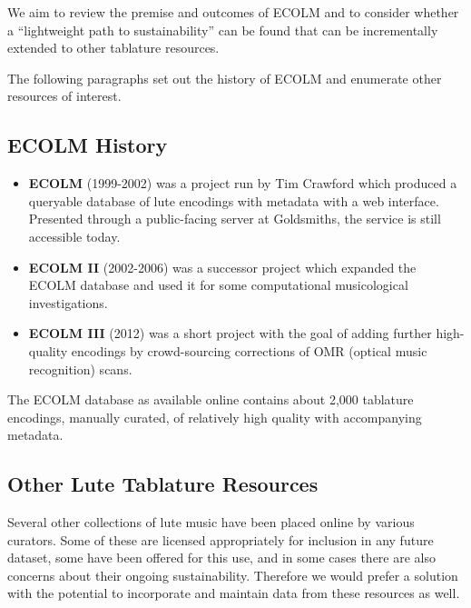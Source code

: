 \documentclass[sigconf]{acmart}
\begin{document}
\begin{sloppypar}
  We aim to review the premise and outcomes of ECOLM and to consider
  whether a ``lightweight path to sustainability'' can be found that
  can be incrementally extended to other tablature resources.

  The following paragraphs set out the history of ECOLM and enumerate
  other resources of interest.

  \subsection{ECOLM History}

  \begin{itemize}
  \item {\bf ECOLM} (1999-2002) was a project run by Tim Crawford
    which produced a queryable database of lute encodings with
    metadata with a web interface. Presented through a public-facing
    server at Goldsmiths, the service is still accessible today.
  \item {\bf ECOLM II} (2002-2006) was a successor project which
    expanded the ECOLM database and used it for some computational
    musicological investigations.
  \item {\bf ECOLM III} (2012) was a short project with the goal of
    adding further high-quality encodings by crowd-sourcing
    corrections of OMR (optical music recognition) scans.
  \end{itemize}

  The ECOLM database as available online contains about 2,000
  tablature encodings, manually curated, of relatively high quality
  with accompanying metadata.

  \subsection{Other Lute Tablature Resources}

  Several other collections of lute music have been placed online by
  various curators. Some of these are licensed appropriately for
  inclusion in any future dataset, some have been offered for this
  use, and in some cases there are also concerns about their ongoing
  sustainability. Therefore we would prefer a solution with the
  potential to incorporate and maintain data from these resources as
  well.


\end{sloppypar}
\end{document}
